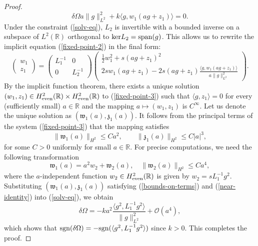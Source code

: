 \documentclass[12pt,reqno]{amsart}
\numberwithin{equation}{section}
\begin{document}
\begin{proof}
\begin{equation}
    \label{solv-eq}
\delta \Omega a \| g \|^2_{L^2} + k  \langle g, w_1 (a g + z_1)\rangle = 0. 
\end{equation}
Under the constraint (\ref{solv-eq}), $L_2$ is invertible with a bounded inverse on a subspace of $L^2(\mathbb{R})$ orthogonal to 
$\text{ker} L_2 = {\rm span}(g)$. This allows us to rewrite the implicit equation (\ref{fixed-point-2}) in the final form:
\begin{equation}
    \label{fixed-point-3}
\begin{pmatrix} w_1 \\ z_1 \end{pmatrix} = \begin{pmatrix} L_1^{-1} & 0  \\ 
0 & L_2^{-1} 
\end{pmatrix} \begin{pmatrix} \frac{1}{2} w_1^2 + s (ag+z_1)^2 \\  
    2 s w_1 (a g + z_1) - 2 s  (a g + z_1) \frac{\langle g, w_1 (a g + z_1)\rangle}{a \| g \|^2_{L^2}}
    \end{pmatrix}.
\end{equation}
By the implicit function theorem, there exists a unique solution $(w_1,z_1) \in H^2_{\rm even}(\mathbb{R}) \times H^2_{\rm even}(\mathbb{R})$ 
to (\ref{fixed-point-3}) such that $\langle g, z_1 \rangle = 0$
for every (sufficiently small) $a \in \mathbb{R}$ and the mapping $a \mapsto (w_1,z_1)$ is $C^{\infty}$. Let us denote the unique solution as $(\mathfrak{w}_1(a),\mathfrak{z}_1(a))$. It follows from the principal terms of the system (\ref{fixed-point-3}) that 
the mapping satisfies 
\begin{equation}
    \label{bounds-on-terms}
\| \mathfrak{w}_1(a) \|_{H^2} \leq C a^2, \qquad \| \mathfrak{z}_1(a) \|_{H^2} \leq C |a|^3,
\end{equation}
for some $C > 0$ uniformly for small $a \in \mathbb{R}$. For precise computations, we need the following transformation 
\begin{equation}
    \label{near-identity}
\mathfrak{w}_1(a) = a^2 w_2 + \mathfrak{w}_2(a), \quad \| \mathfrak{w}_2(a) \|_{H^2} \leq C a^4, 
\end{equation}
where the $a$-independent function $w_2 \in H^2_{\rm even}(\mathbb{R})$ is given by $w_2 = s L_1^{-1} g^2$. Substituting 
$(\mathfrak{w}_1(a),\mathfrak{z}_1(a))$ satisfying (\ref{bounds-on-terms}) and (\ref{near-identity}) into (\ref{solv-eq}), 
we obtain 
\begin{equation}
    \label{delta-Omega}
\delta \Omega = - k a^2  \frac{\langle g^2, L_1^{-1} g^2 \rangle}{\| g \|^2_{L^2}} + \mathcal{O}(a^4),
\end{equation}
which shows that ${\rm sgn}(\delta \Omega) = -{\rm sgn}(\langle g^2, L_1^{-1} g^2 \rangle)$ since $k > 0$. This completes the proof.
\end{proof}
\end{document}

